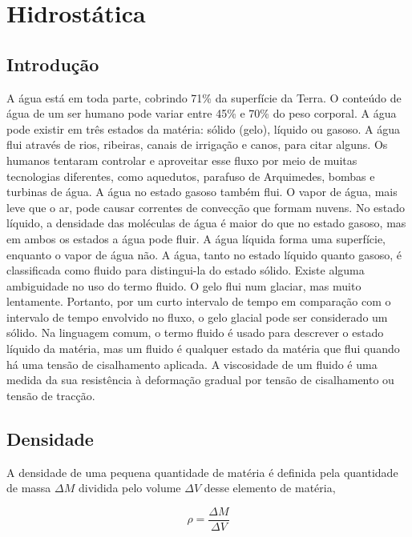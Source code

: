\documentclass[
  portuguese,
  ]{book}
\begin{document}
\hypertarget{hidrostuxe1tica}{%
\chapter{Hidrostática}\label{hidrostuxe1tica}}

\hypertarget{introduuxe7uxe3o}{%
\section{Introdução}\label{introduuxe7uxe3o}}

A água está em toda parte, cobrindo 71\% da superfície da Terra. O conteúdo de água de um ser humano pode variar entre 45\% e 70\% do peso corporal. A água pode existir em três estados da matéria: sólido (gelo), líquido ou gasoso. A água flui através de rios, ribeiras, canais de irrigação e canos, para citar alguns. Os humanos tentaram controlar e aproveitar esse fluxo por meio de muitas tecnologias diferentes, como aquedutos, parafuso de Arquimedes, bombas e turbinas de água. A água no estado gasoso também flui. O vapor de água, mais leve que o ar, pode causar correntes de convecção que formam nuvens. No estado líquido, a densidade das moléculas de água é maior do que no estado gasoso, mas em ambos os estados a água pode fluir. A água líquida forma uma superfície, enquanto o vapor de água não. A água, tanto no estado líquido quanto gasoso, é classificada como fluido para distingui-la do estado sólido. Existe alguma ambiguidade no uso do termo fluido. O gelo flui num glaciar, mas muito lentamente. Portanto, por um curto intervalo de tempo em comparação com o intervalo de tempo envolvido no fluxo, o gelo glacial pode ser considerado um sólido. Na linguagem comum, o termo fluido é usado para descrever o estado líquido da matéria, mas um fluido é qualquer estado da matéria que flui quando há uma tensão de cisalhamento aplicada. A viscosidade de um fluido é uma medida da sua resistência à deformação gradual por tensão de cisalhamento ou tensão de tracção.

\hypertarget{densidade}{%
\section{Densidade}\label{densidade}}

A densidade de uma pequena quantidade de matéria é definida pela quantidade de massa \(\Delta M\) dividida pelo volume \(\Delta V\) desse elemento de matéria,

\begin{equation}
\rho=\frac{\Delta M}{\Delta V}
\label{eq:dens1}
\end{equation}
\end{document}
